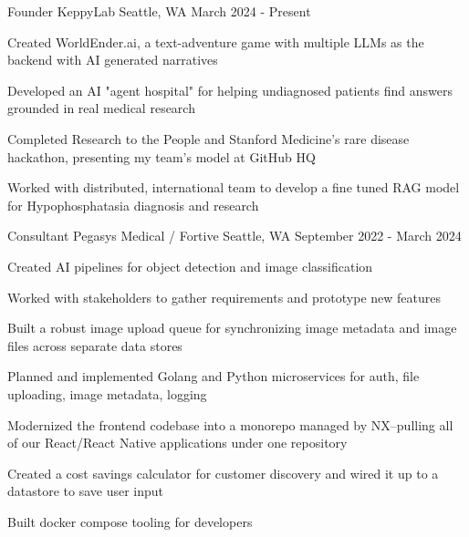 

\begin{cventries}
  \cventry
    {Founder} %
    {KeppyLab} %
    {Seattle, WA} %
    {March 2024 - Present} %
    {
      \begin{cvitems} %
        \item {Created WorldEnder.ai, a text-adventure game with multiple LLMs as the backend with AI generated narratives}
        \item {Developed an AI "agent hospital" for helping undiagnosed patients find answers grounded in real medical research}
        \item {Completed Research to the People and Stanford Medicine's rare disease hackathon, presenting my team's model at GitHub HQ}
        \item {Worked with distributed, international team to develop a fine tuned RAG model for Hypophosphatasia diagnosis and research}
      \end{cvitems}
    }
  \cventry
    {Consultant} %
    {Pegasys Medical / Fortive} %
    {Seattle, WA} %
    {September 2022 - March 2024} %
    {
      \begin{cvitems} %
        \item {Created AI pipelines for object detection and image classification}
        \item {Worked with stakeholders to gather requirements and prototype new features}
        \item {Built a robust image upload queue for synchronizing image metadata and image files across separate data stores}
        \item {Planned and implemented Golang and Python microservices for auth, file uploading, image metadata, logging}
        \item {Modernized the frontend codebase into a monorepo managed by NX--pulling all of our React/React Native applications under one repository}
        \item {Created a cost savings calculator for customer discovery and wired it up to a datastore to save user input}
        \item {Built docker compose tooling for developers}
      \end{cvitems}
    }


\end{cventries}

